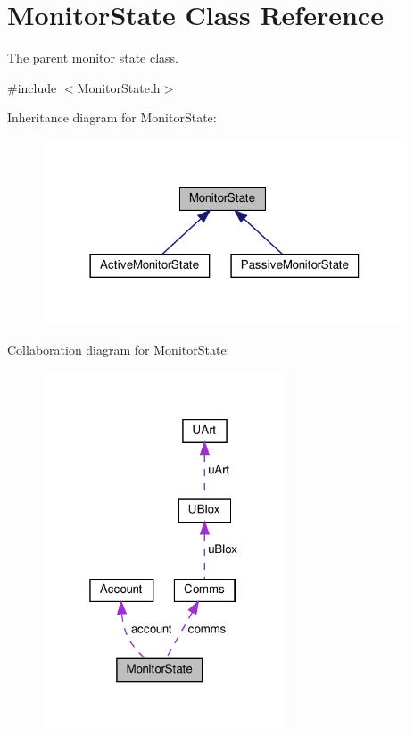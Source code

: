 \hypertarget{class_monitor_state}{}\section{Monitor\+State Class Reference}
\label{class_monitor_state}


The parent monitor state class.  




{\ttfamily \#include $<$Monitor\+State.\+h$>$}



Inheritance diagram for Monitor\+State\+:
\nopagebreak
\begin{figure}[H]
\begin{center}
\leavevmode
\includegraphics[width=306pt]{d2/de4/class_monitor_state__inherit__graph}
\end{center}
\end{figure}


Collaboration diagram for Monitor\+State\+:
\nopagebreak
\begin{figure}[H]
\begin{center}
\leavevmode
\includegraphics[width=205pt]{da/dc4/class_monitor_state__coll__graph}
\end{center}
\end{figure}

